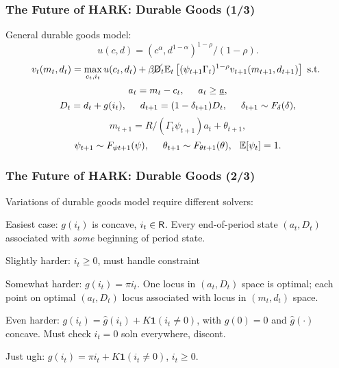 
  \begin{frame}\label{DurableGoods}
    \frametitle{The Future of HARK: Durable Goods (1/3)}

    General durable goods model:
    \begin{equation*}
      u(c,d) = (c^\alpha,d^{1-\alpha})^{1-\rho}/(1-\rho).
    \end{equation*}
    \begin{equation*}
      v_t(m_t,d_t) = \max_{c_t,i_t} u(c_t,d_t) + \beta \cancel{\mathsf{D}}_t \mathbb{E}_t \left[(\psi_{t+1} \Gamma_t)^{1-\rho} v_{t+1}(m_{t+1},d_{t+1}) \right] \text{ s.t. }
    \end{equation*}
    \begin{equation*}
      a_t = m_t - c_t, \hspace{0.5cm} a_t \geq \underline{a},
    \end{equation*}
    \begin{equation*}
      D_t = d_t + g(i_t), \hspace{0.5cm} d_{t+1} = (1-\delta_{t+1})D_t, \hspace{0.5cm} \delta_{t+1} \sim F_{\delta}(\delta),
    \end{equation*}
    \begin{equation*}
      m_{t+1} = R/(\Gamma_t \psi_{t+1}) a_t + \theta_{t+1},
    \end{equation*}
    \begin{equation*}
      \psi_{t+1} \sim F_{\psi t+1}(\psi), \hspace{0.5cm} \theta_{t+1} \sim F_{\theta t+1}(\theta), \hspace{0.25cm} \mathbb{E}[\psi_t] = 1.
    \end{equation*}
  \end{frame}



  \begin{frame}
    \frametitle{The Future of HARK: Durable Goods (2/3)}
    Variations of durable goods model require different solvers:
    \bi
  \item <1-> Easiest case: $g(i_t)$ is concave, $i_t \in \mathsf{R}$.  Every end-of-period state $(a_t,D_t)$ associated with \textit{some} beginning of period state.

  \item <1->Slightly harder: $i_t \geq 0$, must handle constraint

  \item <2->Somewhat harder: $g(i_t) = \pi i_t$.  One locus in $(a_t,D_t)$ space is optimal; each point on optimal $(a_t,D_t)$ locus associated with locus in $(m_t,d_t)$ space.

  \item <3->Even harder: $g(i_t) = \widehat{g}(i_t) + K \mathbf{1}(i_t \neq 0)$, with $\widehat{g}(0) = 0$ and $\widehat{g}(\cdot)$ concave.  Must check $i_t=0$ soln everywhere, discont.

  \item <4->Just ugh: $g(i_t) = \pi i_t +K \mathbf{1}(i_t \neq 0)$, $i_t \geq 0$.
    \ei
  \end{frame}


